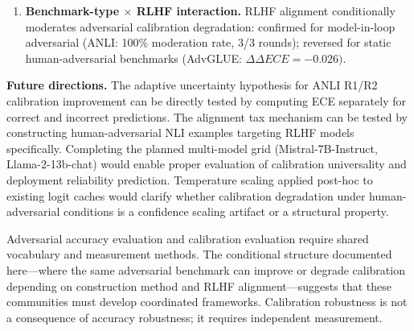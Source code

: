 \begin{enumerate}
\item \textbf{Benchmark-type $\times$ RLHF interaction.} RLHF alignment conditionally moderates adversarial calibration degradation: confirmed for model-in-loop adversarial (ANLI: 100\% moderation rate, 3/3 rounds); reversed for static human-adversarial benchmarks (AdvGLUE: $\Delta \Delta ECE = -0.026)$.
\end{enumerate}

\textbf{Future directions.} The adaptive uncertainty hypothesis for ANLI R1/R2 calibration improvement can be directly tested by computing ECE separately for correct and incorrect predictions. The alignment tax mechanism can be tested by constructing human-adversarial NLI examples targeting RLHF models specifically. Completing the planned multi-model grid (Mistral-7B-Instruct, Llama-2-13b-chat) would enable proper evaluation of calibration universality and deployment reliability prediction. Temperature scaling applied post-hoc to existing logit caches would clarify whether calibration degradation under human-adversarial conditions is a confidence scaling artifact or a structural property.

Adversarial accuracy evaluation and calibration evaluation require shared vocabulary and measurement methods. The conditional structure documented here---where the same adversarial benchmark can improve or degrade calibration depending on construction method and RLHF alignment---suggests that these communities must develop coordinated frameworks. Calibration robustness is not a consequence of accuracy robustness; it requires independent measurement.

